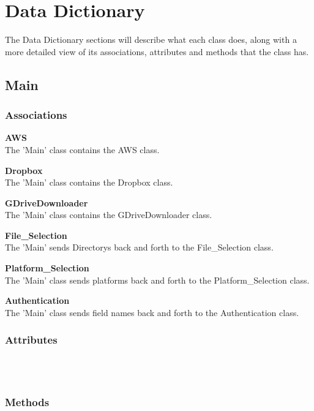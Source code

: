 \section{Data Dictionary}
The Data Dictionary sections will describe what each class does, along with a more detailed view of its
associations, attributes and methods that the class has.

\subsection{Main}

\subsubsection{Associations}
\textbf{AWS} \\
The 'Main' class contains the AWS class.

\textbf{Dropbox} \\
The 'Main' class contains the Dropbox class.

\textbf{GDriveDownloader} \\
The 'Main' class contains the GDriveDownloader class.

\textbf{File\_Selection} \\
The 'Main' sends Directorys back and forth to the File\_Selection class.

\textbf{Platform\_Selection} \\
The 'Main' class sends platforms back and forth to the Platform\_Selection class.

\textbf{Authentication} \\
The 'Main' class sends field names back and forth to the Authentication class.

\subsubsection{Attributes}
\textbf{} \\

\textbf{} \\

\subsubsection{Methods}
\textbf{} \\
  
\textbf{} \\

